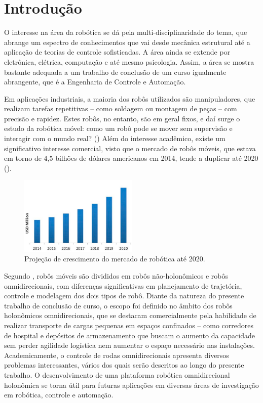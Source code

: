 \section{Introdução}


O interesse na área da robótica se dá pela multi-disciplinaridade do tema, que abrange um espectro de conhecimentos que vai desde mecânica estrutural até a aplicação de teorias de controle sofisticadas. A área ainda se extende por eletrônica, elétrica, computação e até mesmo psicologia. Assim, a área se mostra bastante adequada a um trabalho de conclusão de um curso igualmente abrangente, que é a Engenharia de Controle e Automação.

Em aplicações industriais, a maioria dos robôs utilizados são manipuladores, que realizam tarefas repetitivas -- como soldagem ou montagem de peças -- com precisão e rapidez. Estes robôs, no entanto, são em geral fixos, e daí surge o estudo da robótica móvel: como um robô pode se mover sem supervisão e interagir com o mundo real? (\cite{siegwart2011introduction}) Além do interesse acadêmico, existe um significativo interesse comercial, visto que o mercado de robôs móveis, que estava em torno de 4,5 bilhões de dólares americanos em 2014, tende a duplicar até 2020 (\cite{marketsmarkets}).

\begin{figure}[h]
  \centering
  \includegraphics[width = 0.5\textwidth]{imagens/markets}
  \caption{Projeção de crescimento do mercado de robótica até 2020.}
  \label{fig:markets}
\end{figure}

Segundo \cite{lynch2017modern}, robôs móveis são divididos em robôs não-holonômicos e robôs omnidirecionais, com diferenças significativas em planejamento de trajetória, controle e modelagem dos dois tipos de robô. Diante da natureza do presente trabalho de conclusão de curso, o escopo foi definido no âmbito dos robôs holonômicos omnidirecionais, que se destacam comercialmente pela habilidade de realizar transporte de cargas pequenas em espaços confinados -- como corredores de hospital e depósitos de armazenamento que buscam o aumento da capacidade sem perder agilidade logística nem aumentar o espaço necessário nas instalações. Academicamente, o controle de rodas omnidirecionais apresenta diversos problemas interessantes, vários dos quais serão descritos ao longo do presente trabalho. O desenvolvimento de uma plataforma robótica omnidirecional holonômica se torna útil para futuras aplicações em diversas áreas de investigação em robótica, controle e automação.

